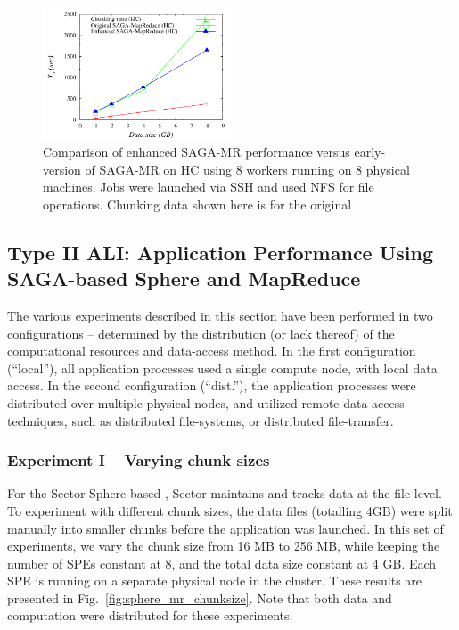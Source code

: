 \documentclass[3p,twocolumn]{elsarticle}
\begin{document}
\begin{figure}[htb!]
 \includegraphics[width=0.5\textwidth]{figures/sagamr_comparison.pdf}
 \caption{Comparison of enhanced SAGA-MR performance versus
   early-version of SAGA-MR on HC using 8 workers running on 8
   physical machines. Jobs were launched via SSH and used NFS for file
   operations. Chunking data shown here is for the original
   \sagamapreduce.} \label{fig:sagamr_comparison}
\end{figure}


\subsection{Type II ALI: Application Performance Using SAGA-based
Sphere and MapReduce}

The various experiments described in this section have been performed
in two configurations -- determined by the distribution (or lack
thereof) of the computational resources and data-access method. In the
first configuration (``local''), all application processes used a
single compute node, with local data access.  In the second
configuration (``dist.''), the application processes were distributed
over multiple physical nodes, and utilized remote data access
techniques, such as distributed file-systems, or distributed
file-transfer. %

\subsubsection{Experiment I -- Varying chunk sizes}

For the Sector-Sphere based \wc, Sector maintains and tracks data at
the file level. To experiment with different chunk sizes, the data
files (totalling 4GB) were split manually into smaller chunks before
the \wc application was launched. In this set of experiments, we vary
the chunk size from 16 MB to 256 MB, while keeping the number of SPEs
constant at 8, and the total data size constant at 4 GB. Each SPE is
running on a separate physical node in the cluster. These results are
presented in Fig.~\ref{fig:sphere_mr_chunksize}.  Note that both data
and computation were distributed for these experiments.
\end{document}
